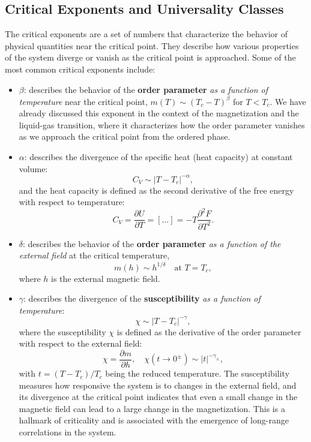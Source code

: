 \subsection{Critical Exponents and Universality Classes}

The critical exponents are a set of numbers that characterize the behavior of physical quantities near the critical point. They describe how various properties of the system diverge or vanish as the critical point is approached. Some of the most common critical exponents include:
\begin{itemize}
    \item $\beta$: describes the behavior of the \textbf{order parameter} \textit{as a function of temperature} near the critical point, $m(T) \sim (T_c - T)^\beta$ for $T < T_c$. We have already discussed this exponent in the context of the magnetization and the liquid-gas transition, where it characterizes how the order parameter vanishes as we approach the critical point from the ordered phase.
    \item $\alpha$: describes the divergence of the specific heat (heat capacity) at constant volume:
          \[
              C_V \sim |T - T_c|^{-\alpha},
          \]
          and the heat capacity is defined as the second derivative of the free energy with respect to temperature:
          \[
              C_V = \frac{\partial U}{\partial T} = [\dots] = -T \frac{\partial^2 F}{\partial T^2}.
          \]
    \item $\delta$: describes the behavior of the \textbf{order parameter} \textit{as a function of the external field} at the critical temperature,
          \[
              m(h) \sim h^{1/\delta} \quad \text{at } T = T_c,
          \]
          where $h$ is the external magnetic field.
    \item $\gamma$: describes the divergence of the \textbf{susceptibility} \textit{as a function of temperature}:
          \[
              \chi \sim |T - T_c|^{-\gamma},
          \]
          where the susceptibility $\chi$ is defined as the derivative of the order parameter with respect to the external field:
          \[
              \chi = \frac{\partial m}{\partial h}, \quad \chi(t \to 0^{\pm}) \sim |t|^{-\gamma_{\pm}},
          \]
          with $t = (T - T_c)/T_c$ being the reduced temperature. The susceptibility measures how responsive the system is to changes in the external field, and its divergence at the critical point indicates that even a small change in the magnetic field can lead to a large change in the magnetization. This is a hallmark of criticality and is associated with the emergence of long-range correlations in the system.

\end{itemize}

